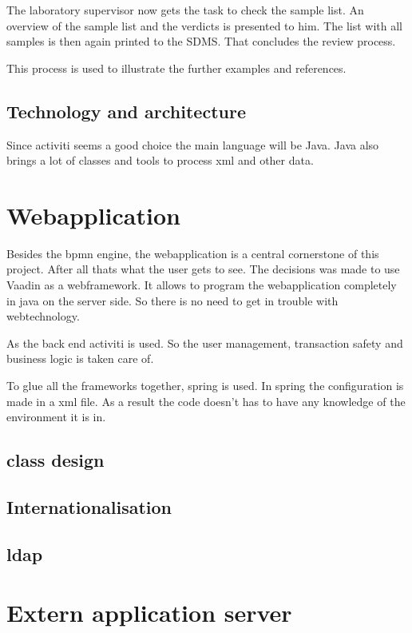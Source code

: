 \documentclass[paper=a4,twoside=false,BCOR=0mm,DIV=calc,fontsize=12pt]{scrartcl}
\begin{document}
The laboratory supervisor now gets the task to check the sample list. An overview of the sample list and the verdicts is presented to him.
The list with all samples is then again printed to the SDMS. That concludes the review process.

This process is used to illustrate the further examples and references.



\subsection{Technology and architecture}
Since activiti seems a good choice the main language will be Java.
Java also brings a lot of classes and tools to process xml and other data.


\section{Webapplication}
Besides the bpmn engine, the webapplication is a central cornerstone of this project. After all thats what the user gets to see.
The decisions was made to use Vaadin as a webframework. It allows to program the webapplication completely in java on the server side. So there is no need to get in trouble with webtechnology.

As the back end activiti is used. So the user management, transaction safety and business logic is taken care of.

To glue all the frameworks together, spring is used. In spring the configuration is made in a xml file. As a result the code doesn't has to have any knowledge of the environment it is in.


\subsection{class design}






\subsection{Internationalisation}




\subsection{ldap}


\section{Extern application server}
\end{document}
